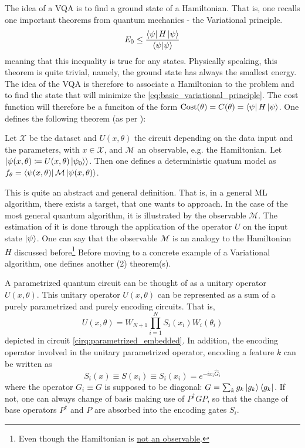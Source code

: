 The idea of a VQA is to find a ground state of a Hamiltonian. That is, one recalls one important 
theorems from quantum mechanics - the Variational principle. 
\begin{equation}
  E_0 \leq \frac{\bra{\psi}H\ket{\psi}}{\bra{\psi}\ket{\psi}}
  \label{eq:basic_variational_principle}
\end{equation}
meaning that this inequality is true for any states. Physically speaking, this theorem is quite trivial, 
namely, the ground state has always the smallest energy. The idea of the VQA is therefore to associate a 
Hamiltonian to the problem and to find the state that will minimize the \autoref{eq:basic_variational_principle}.
The cost function will therefore be a funciton of the form 
$\text{Cost}(\theta) = C(\theta) = \bra{\psi}H\ket{\psi}$.
One defines the following theorem (as per \cite{schuld_machine_2018}):
\begin{prettytheorem}
  Let $\mathcal{X}$ be the dataset and $U(x,\theta)$ the circuit depending on the data input and the parameters, with $x\in \mathcal{X}$, and $\mathcal{M}$ 
  an observable, e.g. the Hamiltonian. Let $\ket{\psi(x, \theta) \coloneq U(x, \theta)\ket{\psi_0}}$. Then one defines a deterministic 
  quatum model as $f_{\theta} = \bra{\psi(x, \theta)}\mathcal{M}\ket{\psi(x,\theta)}$.
  \label{th:deterministic_quantum_model}
\end{prettytheorem}
This is quite an abstract and general definition. That is, in a general ML algorithm, there exists a target, that one wants to approach. In the case of the 
most general quantum algorithm, it is illustrated by the observable $\mathcal{M}$. The estimation of it is done through the application of the operator $U$ on the input 
state $\ket{\psi}$. One can say that the observable $\mathcal{M}$ is an analogy to the Hamiltonian $H$ discussed before\footnote{Even though the Hamiltonian is \underline{not an observable}.}
Before moving to a concrete example of a Variational algorithm, one defines another (2) theorem(s).
\begin{prettytheorem}
  A parametrized quantum circuit can be thought of as a unitary operator $U(x,\theta)$. This unitary operator 
  $U(x,\theta)$ can be represented as a sum of a purely parametrized and purely encoding circuits. That is, 
  \begin{equation}
    U(x,\theta) = W_{N+1}\prod_{i=1}^{N}S_i(x_i)W_i(\theta_i)
  \end{equation}
  depicted in circuit \ref{cirq:parametrized_embedded}. In addition, the encoding operator involved in 
  the unitary parametrized 
  operator, encoding a feature $k$ can be written as 
  \begin{equation}
    S_i(x) \equiv S(x_i) \equiv S_i(x_i) = e^{-ix_i\hat{G}_i}
  \end{equation}
  where the operator $G_i \equiv G$ is supposed to be diagonal: $G = \sum_k g_k\ket{g_k}\bra{g_k}$.
  If not, one can always change of basis making use of $P^{\dag}GP$, so that the change of base operators 
  $P^{\dag}$ and $P$ are absorbed into the encoding gates $S_i$.
  \label{th:u_as_s_and_w}
\end{prettytheorem}
